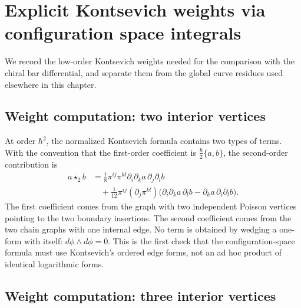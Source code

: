 \section{Explicit Kontsevich weights via configuration space integrals}
\label{sec:kontsevich-weights-explicit}

We record the low-order Kontsevich weights needed for the comparison
with the chiral bar differential, and separate them from the global
curve residues used elsewhere in this chapter.

\subsection{Weight computation: two interior vertices}
\label{subsec:kontsevich-2vertex}

\begin{computation}
\label{comp:kontsevich-2vertex}

At order $\hbar^2$, the normalized Kontsevich formula contains two
types of terms. With the convention that the first-order coefficient is
\(\frac{\hbar}{2}\{a,b\}\), the second-order contribution is
\[
\begin{aligned}
a\star_2 b
&=
\frac{1}{8}\pi^{ij}\pi^{kl}
\partial_i\partial_k a\,\partial_j\partial_l b \\
&\quad+
\frac{1}{12}\pi^{ij}(\partial_j\pi^{kl})
\bigl(\partial_i\partial_k a\,\partial_l b
-\partial_k a\,\partial_i\partial_l b\bigr).
\end{aligned}
\]
The first coefficient comes from the graph with two independent
Poisson vertices pointing to the two boundary insertions. The second
coefficient comes from the two chain graphs with one internal edge. No
term is obtained by wedging a one-form with itself:
\(d\phi\wedge d\phi=0\). This is the first check that the
configuration-space formula must use Kontsevich's ordered edge forms,
not an ad hoc product of identical logarithmic forms.
\end{computation}

\subsection{Weight computation: three interior vertices}
\label{subsec:kontsevich-3vertex}

